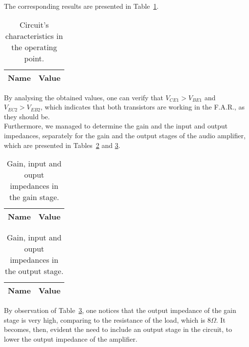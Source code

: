 The corresponding results are presented in Table~\ref{tab:op}. \\

\begin{table}[H]
  \centering
  \begin{tabular}{|l|r|}
    \hline    
    {\bf Name} & {\bf Value} \\ \hline
    
  \end{tabular}
  \caption{Circuit's characteristics in the operating point.}
  \label{tab:op}
\end{table}

By analysing the obtained values, one can verify that $V_{CE1}>V_{BE1}$ and $V_{EC2}>V_{EB2}$, which indicates that both transistors are working in the F.A.R., as they should be. \\

Furthermore, we managed to determine the gain and the input and output impedances, separately for the gain and the output stages of the audio amplifier, which are presented in Tables~\ref{tab:gaindata} and \ref{tab:outputdata}.

\noindent
\begin{minipage}[c]{0.5\linewidth}

\begin{table}[H]
  \centering
  \begin{tabular}{|l|r|}
    \hline    
    {\bf Name} & {\bf Value} \\ \hline
    
  \end{tabular}
  \caption{Gain, input and ouput impedances in the gain stage.}
  \label{tab:gaindata}
\end{table}

\end{minipage}
\begin{minipage}[c]{0.5\linewidth}

\begin{table}[H]
  \centering
  \begin{tabular}{|l|r|}
    \hline    
    {\bf Name} & {\bf Value} \\ \hline
    
  \end{tabular}
  \caption{Gain, input and ouput impedances in the output stage.}
  \label{tab:outputdata}
\end{table}

\end{minipage}

By observation of Table~\ref{tab:outputdata}, one notices that the output impedance of the gain stage is very high, comparing to the resistance of the load, which is $8\Omega$. It becomes, then, evident the need to include an output stage in the circuit, to lower the output impedance of the amplifier.\\

